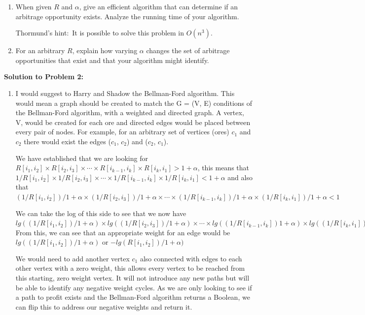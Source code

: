 \documentclass[12pt]{article}
\begin{document}
\begin{enumerate}
	\begin{enumerate}
	\item When given $R$ and $\alpha$, give an efficient algorithm that can determine if an arbitrage opportunity exists. Analyze the running time of your algorithm.
	
	Thormund's hint:\ It is possible to solve this problem in $O(n^{3})$. 
	\item For an arbitrary $R$, explain how varying $\alpha$ changes the set of arbitrage opportunities that exist and that your algorithm might identify.
	\end{enumerate}
    
    \pagebreak
\textbf{Solution to Problem 2:}

\begin{enumerate}
    \item
    I would suggest to Harry and Shadow the Bellman-Ford algorithm. This would mean a graph should be created to match the G = (V, E) conditions of the Bellman-Ford algorithm, with a weighted and directed graph. A vertex, V, would be created for each ore and directed edges would be placed between every pair of nodes. For example, for an arbitrary set of vertices (ores) $c_{1}$ and $c_{2}$ there would exist the edges ($c_{1}$, $c_{2}$) and ($c_{2}$, $c_{1}$). \newline \smallskip
    
    We have established that we are looking for $R[i_{1}, i_{2}] \times R[i_{2}, i_{3}] \times \cdots \times R[i_{k-1}, i_{k}] \times R[i_{k}, i_{1}] > 1 + \alpha$, this means that $1/R[i_{1}, i_{2}] \times 1/R[i_{2}, i_{3}] \times \cdots \times 1/R[i_{k-1}, i_{k}] \times 1/R[i_{k}, i_{1}] < 1 + \alpha$ and also that $(1/R[i_{1}, i_{2}])/1 + \alpha \times (1/R[i_{2}, i_{3}])/1 + \alpha \times \cdots \times (1/R[i_{k-1}, i_{k}])/1 + \alpha \times (1/R[i_{k}, i_{1}])/1 + \alpha < 1$ \newline \smallskip
    
    
    We can take the log of this side to see that we now have $lg((1/R[i_{1}, i_{2}])/1 + \alpha) \times lg((1/R[i_{2}, i_{3}])/1 + \alpha) \times \cdots \times lg((1/R[i_{k-1}, i_{k}])1 + \alpha) \times lg((1/R[i_{k}, i_{1}])1 + \alpha) < 0$ \newline
    From this, we can see that an appropriate weight for an edge would be $lg((1/R[i_{1}, i_{2}])/1 + \alpha)$ or $-lg(R[i_{1}, i_{2}])/1 + \alpha)$ \newline \smallskip
    
    We would need to add another vertex $c_{1}$ also connected with edges to each other vertex with a zero weight, this allows every vertex to be reached from this starting, zero weight vertex. It will not introduce any new paths but will be able to identify any negative weight cycles. As we are only looking to see if a path to profit exists and the Bellman-Ford algorithm returns a Boolean, we can flip this to address our negative weights and return it. \newline \smallskip
    

\end{enumerate}
\end{enumerate}
\end{document}
